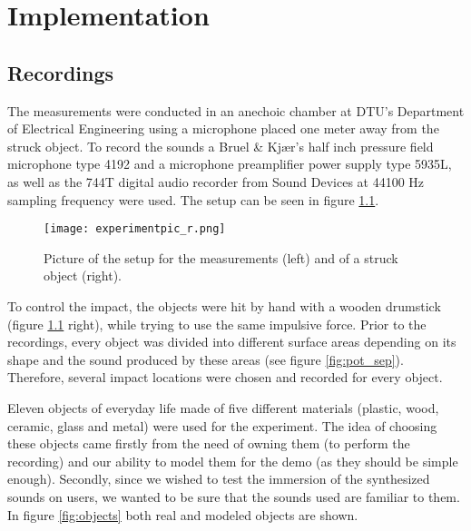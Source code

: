 \chapter{Implementation}\label{ch:implementation}


%

\section{Recordings}\label{sec:recordings}

The measurements were conducted in an anechoic chamber at \gls{DTU}'s Department of Electrical Engineering using a microphone placed one meter away from the struck object. To record the sounds a Bruel \& Kjær's half inch pressure field microphone type 4192 and a microphone preamplifier power supply type 5935L, as well as the 744T digital audio recorder from Sound Devices at 44100 Hz sampling frequency were used. The setup can be seen in figure \ref{fig:experiment}.

\begin{figure}[H]
  \centering
    \texttt{[image: experimentpic\_r.png]}
      \caption{Picture of the setup for the measurements (left) and of a struck object (right).}\label{fig:experiment}
\end{figure}

To control the impact, the objects were hit by hand with a wooden drumstick (figure \ref{fig:experiment} right), while trying to use the same impulsive force. Prior to the recordings, every object was divided into different surface areas depending on its shape and the sound produced by these areas (see figure \ref{fig:pot_sep}). Therefore, several impact locations were chosen and recorded for every object.

Eleven objects of everyday life made of five different materials (plastic, wood, ceramic, glass and metal) were used for the experiment. The idea of choosing these objects came firstly from the need of owning them (to perform the recording) and our ability to model them for the demo (as they should be simple enough). Secondly, since we wished to test the immersion of the synthesized sounds on users, we wanted to be sure that the sounds used are familiar to them. In figure \ref{fig:objects} both real and modeled objects are shown. 

